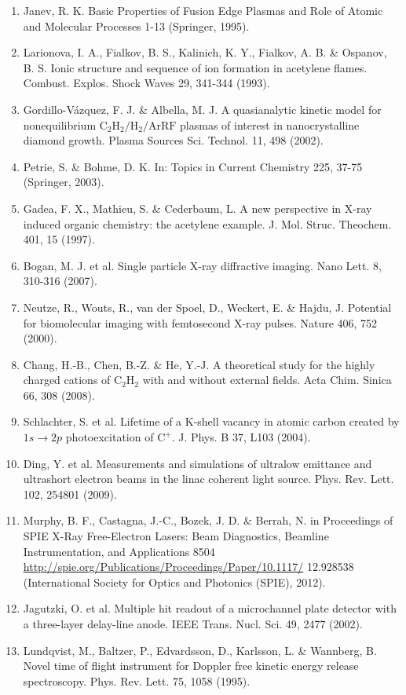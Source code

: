 \documentclass[10pt]{article}
\begin{document}
\begin{enumerate}
  \item Janev, R. K. Basic Properties of Fusion Edge Plasmas and Role of Atomic and Molecular Processes 1-13 (Springer, 1995).
  \item Larionova, I. A., Fialkov, B. S., Kalinich, K. Y., Fialkov, A. B. \& Ospanov, B. S. Ionic structure and sequence of ion formation in acetylene flames. Combust. Explos. Shock Waves 29, 341-344 (1993).
  \item Gordillo-Vázquez, F. J. \& Albella, M. J. A quasianalytic kinetic model for nonequilibrium $\mathrm{C}_{2} \mathrm{H}_{2} / \mathrm{H}_{2} / \mathrm{Ar} \mathrm{RF}$ plasmas of interest in nanocrystalline diamond growth. Plasma Sources Sci. Technol. 11, 498 (2002).
  \item Petrie, S. \& Bohme, D. K. In: Topics in Current Chemistry 225, 37-75 (Springer, 2003).
  \item Gadea, F. X., Mathieu, S. \& Cederbaum, L. A new perspective in X-ray induced organic chemistry: the acetylene example. J. Mol. Struc. Theochem. 401, 15 (1997).
  \item Bogan, M. J. et al. Single particle X-ray diffractive imaging. Nano Lett. 8, 310-316 (2007).
  \item Neutze, R., Wouts, R., van der Spoel, D., Weckert, E. \& Hajdu, J. Potential for biomolecular imaging with femtosecond X-ray pulses. Nature 406, 752 (2000).
  \item Chang, H.-B., Chen, B.-Z. \& He, Y.-J. A theoretical study for the highly charged cations of $\mathrm{C}_{2} \mathrm{H}_{2}$ with and without external fields. Acta Chim. Sinica 66, 308 (2008).
  \item Schlachter, S. et al. Lifetime of a K-shell vacancy in atomic carbon created by $1 s \rightarrow 2 p$ photoexcitation of $\mathrm{C}^{+}$. J. Phys. B 37, L103 (2004).
  \item Ding, Y. et al. Measurements and simulations of ultralow emittance and ultrashort electron beams in the linac coherent light source. Phys. Rev. Lett. 102, 254801 (2009).
  \item Murphy, B. F., Castagna, J.-C., Bozek, J. D. \& Berrah, N. in Proceedings of SPIE X-Ray Free-Electron Lasers: Beam Diagnostics, Beamline Instrumentation, and Applications 8504 \href{http://spie.org/Publications/Proceedings/Paper/10.1117/}{http://spie.org/Publications/Proceedings/Paper/10.1117/} 12.928538 (International Society for Optics and Photonics (SPIE), 2012).
  \item Jagutzki, O. et al. Multiple hit readout of a microchannel plate detector with a three-layer delay-line anode. IEEE Trans. Nucl. Sci. 49, 2477 (2002).
  \item Lundqvist, M., Baltzer, P., Edvardsson, D., Karlsson, L. \& Wannberg, B. Novel time of flight instrument for Doppler free kinetic energy release spectroscopy. Phys. Rev. Lett. 75, 1058 (1995).
\end{enumerate}
\end{document}

